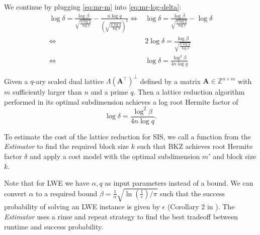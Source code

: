 We continue by plugging \cref{eq:mr-m} into \cref{eq:mr-log-delta}:
\begin{align}
  \log \delta = \frac{\log \beta}{\sqrt{\frac{n \log q}{\log \delta}}} - \frac{n \log q}{\left(\sqrt{\frac{n \log q}{\log \delta}}\right)^2} \iff & \log \delta = \frac{\log \beta}{\sqrt{\frac{n \log q}{\log \delta}}} - \log \delta \\
  \iff                                                                                                                                            & 2\log \delta = \frac{\log \beta}{\sqrt{\frac{n \log q}{\log \delta}}}              \\
  \iff                                                                                                                                            & \log \delta = \frac{\log^2 \beta}{4n \log q}
\end{align}

\begin{theorem}
  Given a $q$-ary scaled dual lattice $\Lambda(\mathbf{A}^\intercal)^{\perp}$ defined by a matrix $\mathbf{A} \in \mathbb{Z}^{n \times m}$ with $m$ sufficiently larger than $n$ and a prime $q$. Then a lattice reduction algorithm performed in its optimal subdimension achieves a log root Hermite factor of
  \begin{equation}
    \log \delta = \frac{\log^2 \beta}{4n \log q}. \label{eq:mr-log-RHF}
  \end{equation}
\end{theorem}

To estimate the cost of the lattice reduction for SIS, we call a function from the \textit{Estimator} to find the required block size $k$ such that BKZ achieves root Hermite factor $\delta$ and apply a cost model with the optimal subdimension $m'$ and block size $k$.

Note that for LWE we have $\alpha, q$ as input parameters instead of a bound. We can convert $\alpha$ to a required bound $\beta = \frac{1}{\alpha} \sqrt{\ln (\frac{1}{\epsilon})/ \pi}$ such that the success probability of solving an LWE instance is given by $\epsilon$ (Corollary 2 in \cite{APS15}). The \textit{Estimator} uses a rinse and repeat strategy to find the best tradeoff between runtime and success probability.






